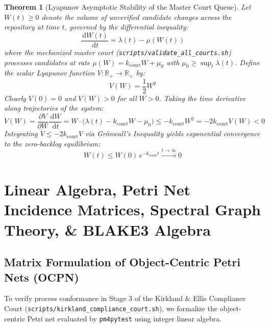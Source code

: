 \documentclass[10pt,twoside,openany]{book}
\theoremstyle{plain}
\newtheorem{theorem}{Theorem}[chapter]
\theoremstyle{definition}
\theoremstyle{remark}
\newcommand{\R}{\mathbb{R}}
\newcommand{\dd}{\,\mathrm{d}}
\begin{document}
\begin{theorem}[Lyapunov Asymptotic Stability of the Master Court Queue]
Let $W(t) \ge 0$ denote the volume of unverified candidate changes across the repository at time $t$, governed by the differential inequality:
\begin{equation}
\frac{\dd W(t)}{\dd t} = \lambda(t) - \mu(W(t))
\end{equation}
where the mechanized master court (\texttt{scripts/validate\_all\_courts.sh}) processes candidates at rate $\mu(W) = k_{\mathrm{court}} W + \mu_0$ with $\mu_0 \ge \sup_t \lambda(t)$. Define the scalar Lyapunov function $V: \R_+ \to \R_+$ by:
\begin{equation}
V(W) = \frac{1}{2} W^2
\end{equation}
Clearly $V(0) = 0$ and $V(W) > 0$ for all $W > 0$. Taking the time derivative along trajectories of the system:
\begin{equation}
\dot{V}(W) = \frac{\partial V}{\partial W} \frac{\dd W}{\dd t} = W \cdot \big( \lambda(t) - k_{\mathrm{court}} W - \mu_0 \big) \le -k_{\mathrm{court}} W^2 = -2 k_{\mathrm{court}} V(W) < 0
\end{equation}
Integrating $\dot{V} \le -2 k_{\mathrm{court}} V$ via Gr\"onwall's Inequality yields exponential convergence to the zero-backlog equilibrium:
\begin{equation}
W(t) \le W(0)\, e^{-k_{\mathrm{court}} t} \xrightarrow{t \to \infty} 0
\end{equation}
\end{theorem}

\chapter{Linear Algebra, Petri Net Incidence Matrices, Spectral Graph Theory, \& BLAKE3 Algebra}

\section{Matrix Formulation of Object-Centric Petri Nets (OCPN)}
To verify process conformance in Stage 3 of the Kirkland \& Ellis Compliance Court (\texttt{scripts/kirkland\_compliance\_court.sh}), we formalize the object-centric Petri net evaluated by \texttt{pm4pytest} using integer linear algebra.
\end{document}
